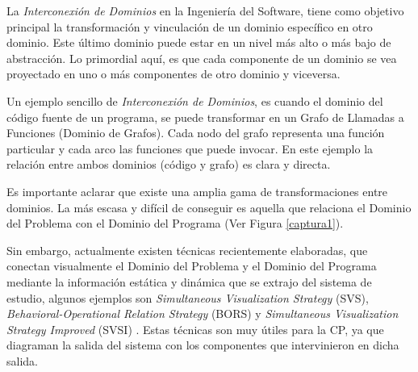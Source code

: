 La \textit{Interconexión de Dominios} en la Ingeniería del Software, tiene como objetivo principal la transformación y vinculación de un dominio específico en otro dominio. Este último dominio puede estar en un nivel más alto o más bajo de abstracción. Lo primordial aquí, es que cada componente de un dominio se vea proyectado en uno o más componentes de otro dominio y viceversa.


Un ejemplo sencillo de \textit{Interconexión de Dominios}, es cuando el dominio del código fuente de un programa, se puede transformar en un Grafo de Llamadas a Funciones (Dominio de Grafos). Cada nodo del grafo representa una función particular y cada arco las funciones que puede invocar. En este ejemplo la relación entre ambos dominios (código y grafo) es clara y directa. 

Es importante aclarar que existe una amplia gama de transformaciones entre dominios. La más escasa y difícil de conseguir es aquella que relaciona el Dominio del Problema con el Dominio del Programa (Ver Figura \ref{captura1}).

Sin embargo, actualmente existen técnicas recientemente elaboradas, que conectan visualmente el Dominio del Problema y el Dominio del Programa mediante la información estática y dinámica que se extrajo del sistema de estudio, algunos ejemplos son \textit{Simultaneous Visualization Strategy} (SVS), \textit{Behavioral-Operational Relation Strategy} (BORS) y \textit{Simultaneous Visualization Strategy Improved} (SVSI) \cite{BRM10,MPMR07,MBPHRU10}. Estas técnicas son muy útiles para la CP, ya que diagraman la salida del sistema con los componentes que intervinieron  en dicha salida.


